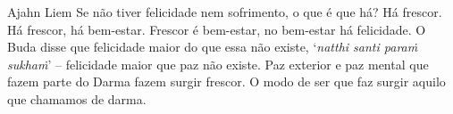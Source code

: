 
\begin{quotepage}{0.56\linewidth}{Ajahn Liem}
Se não tiver felicidade nem sofrimento, o que é que há? Há frescor. Há
frescor, há bem-estar. Frescor é bem-estar, no bem-estar há felicidade.
O Buda disse que felicidade maior do que essa não existe,
‘\emph{natthi santi paraṁ sukhaṁ}’ – felicidade maior que
paz não existe. Paz exterior e paz mental que fazem parte do Darma
fazem surgir frescor. O modo de ser que faz surgir aquilo que chamamos de darma.
\end{quotepage}

